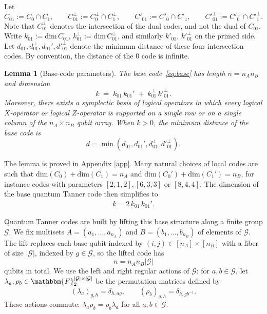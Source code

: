 \documentclass[a4paper,onecolumn,11pt]{quantumarticle}
\def\G{\mathcal{G}}
\def\F{\mathbbm{F}}
\def\dim{\mbox{dim}}
\newtheorem{lemma}[theo]{Lemma}
\begin{document}
Let
\[
C_{01}:=C_0\cap C_1,\qquad C_{01}^\perp:=C_0^\perp\cap C_1^\perp,
\qquad
C'_{01}:=C'_0\cap C'_1,\qquad C'^\perp_{01}:=C'^\perp_0 \cap C'^\perp_1.
\]
Note that $C_{01}^\perp$ denotes the intersection of the dual codes, and not the dual of $C_{01}$. 
Write
$k_{01}:=\dim \, C_{01}$, $k^\perp_{01}:=\dim \, C_{01}^\perp$, and similarly $k'_{01}$, $k'^\perp_{01}$ on the primed side.
Let $d_{01},d^\perp_{01},d_{01}',d'^\perp_{01}$ denote the minimum distance of these four intersection codes. By convention, the distance of the 0 code is infinite.


\begin{lemma}[Base-code parameters]\label{lem}
The base code~\eqref{eq:base} has length $n=n_A n_B$ and dimension
\[
k \;=\; k_{01}\,k_{01}' \;+\; k_{01}^\perp\, k'^\perp_{01}.
\]
Moreover, there exists a symplectic basis of logical operators in which every logical $X$-operator or logical $Z$-operator is supported on a single row or on a single column of the $n_A\times n_B$ qubit array. When $k>0$, the minimum distance of the base code is 
\[ d=\min(d_{01},d_{01}',d_{01}^\perp,d'^\perp_{01}).\]
\end{lemma}


The lemma is proved in Appendix \ref{app}.
Many natural choices of local codes are such that $\mathrm{dim}(C_0) + \mathrm{dim}(C_1) = n_A$ and $\mathrm{dim}(C_0') + \mathrm{dim}(C_1') = n_B$, for instance codes with parameters $[2,1,2], [6,3,3]$ or $[8,4,4]$. The dimension of the base quantum Tanner code then simplifies to
\begin{align*}
k = 2\, k_{01}\,k_{01}'.
\end{align*}




Quantum Tanner codes are built by lifting this base structure along a finite group $\G$.
We fix multisets $A=(a_1,\dots,a_{n_A})$ and $B=(b_1,\dots,b_{n_B})$ of elements of $\G$.
The lift replaces each base qubit indexed by $(i,j)\in[n_A]\times[n_B]$ with a fiber of size $|\G|$, indexed by $g\in \G$, so the lifted code has
\[
n = n_A n_B |\G|
\]
qubits in total. We use the left and right regular actions of $\G$: for $a,b\in \G$, let $\lambda_a,\rho_b\in\F_2^{|\G|\times |\G|}$ be the permutation matrices defined by
\[
(\lambda_a)_{g,h}=\delta_{h,ag},
\qquad
(\rho_b)_{g,h}=\delta_{h,gb^{-1}} .
\]
These actions commute: $\lambda_a\rho_b=\rho_b\lambda_a$ for all $a,b\in \G$.
\end{document}
